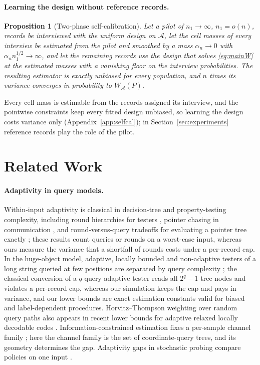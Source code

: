 \documentclass{article}
\newtheorem{proposition}[theorem]{Proposition}
\newcommand{\A}{\mathcal A}
\begin{document}
\paragraph{Learning the design without reference records.}
\begin{proposition}[Two-phase self-calibration]\label{prop:selfcalmain}
Let a pilot of $n_1\to\infty$, $n_1=o(n)$, records be interviewed with the uniform design on $\A$, let the cell masses of every interview be estimated from the pilot and smoothed by a mass $\alpha_n\to0$ with $\alpha_n n_1^{1/2}\to\infty$, and let the remaining records use the design that solves \eqref{eq:mainW} at the estimated masses with a vanishing floor on the interview probabilities. The resulting estimator is exactly unbiased for every population, and $n$ times its variance converges in probability to $W_\A(P)$.
\end{proposition}
Every cell mass is estimable from the records assigned its interview, and the pointwise constraints keep every fitted design unbiased, so learning the design costs variance only (Appendix~\ref{app:selfcal}); in Section~\ref{sec:experiments} reference records play the role of the pilot.



\section{Related Work}\label{sec:related}
\paragraph{Adaptivity in query models.} Within-input adaptivity is classical in decision-tree and property-testing complexity, including round hierarchies for testers \citep{canonne2018}, pointer chasing in communication \citep{nisan1993}, and round-versus-query tradeoffs for evaluating a pointer tree exactly \citep{cook2012,li2026regex}; these results count queries or rounds on a worst-case input, whereas ours measure the variance that a shortfall of rounds costs under a per-record cap. In the huge-object model, adaptive, locally bounded and non-adaptive testers of a long string queried at few positions are separated by query complexity \citep{goldreich2022,chakraborty2023,adar2024}; the classical conversion of a $q$-query adaptive tester reads all $2^q-1$ tree nodes and violates a per-record cap, whereas our simulation keeps the cap and pays in variance, and our lower bounds are exact estimation constants valid for biased and label-dependent procedures. Horvitz--Thompson weighting over random query paths also appears in recent lower bounds for adaptive relaxed locally decodable codes \citep{goldberg2026}. Information-constrained estimation fixes a per-sample channel family \citep{acharya2019,barnes2020}; here the channel family is the set of coordinate-query trees, and its geometry determines the gap. Adaptivity gaps in stochastic probing compare policies on one input \citep{gupta2016,hellerstein2022}.
\end{document}
